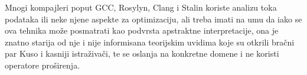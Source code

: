 Mnogi kompajleri poput GCC, Rosylyn, Clang i Stalin koriste analizu toka podataka ili neke njene aspekte za optimizaciju, ali treba imati na umu da iako se ova tehnika može posmatrati kao podvrsta apstraktne interpretacije, ona je znatno starija od nje i nije informisana teorijskim uvidima koje su otkrili bračni par Kuso i kasniji istraživači, te se oslanja na konkretne domene i ne koristi operatore proširenja.



